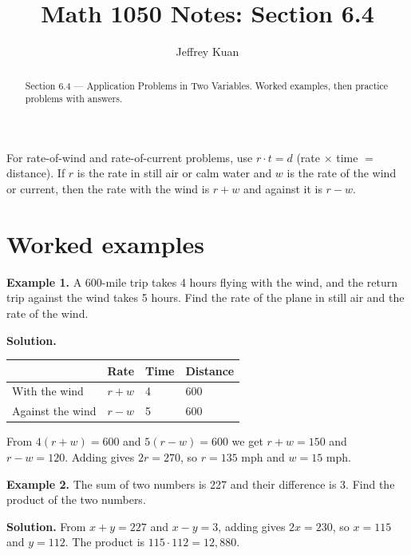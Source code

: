 \documentclass{ximera}
\author{Jeffrey Kuan}
\title{Math 1050 Notes: Section 6.4}
\begin{document}
\begin{abstract}
    Section 6.4 --- Application Problems in Two Variables.
    Worked examples, then practice problems with answers.
\end{abstract}

\maketitle

For rate-of-wind and rate-of-current problems, use $r\cdot t = d$ (rate $\times$ time $=$
distance). If $r$ is the rate in still air or calm water and $w$ is the rate of the wind
or current, then the rate with the wind is $r+w$ and against it is $r-w$.

\section*{Worked examples}

\begin{problem}

\textbf{Example 1.} A 600-mile trip takes 4 hours flying with the wind, and the return
trip against the wind takes 5 hours. Find the rate of the plane in still air and the rate
of the wind.

\begin{hint}
\textbf{Solution.}
\begin{center}
\begin{tabular}{|l|l|l|l|}
\hline
 & Rate & Time & Distance \\
\hline
With the wind & $r+w$ & 4 & 600 \\
\hline
Against the wind & $r-w$ & 5 & 600 \\
\hline
\end{tabular}
\end{center}
From $4(r+w)=600$ and $5(r-w)=600$ we get $r+w=150$ and $r-w=120$. Adding gives
$2r=270$, so $r=135$ mph and $w=15$ mph.
\end{hint}
\end{problem}

\begin{problem}

\textbf{Example 2.} The sum of two numbers is 227 and their difference is 3. Find the
product of the two numbers.

\begin{hint}
\textbf{Solution.} From $x+y=227$ and $x-y=3$, adding gives $2x=230$, so $x=115$ and
$y=112$. The product is $115 \cdot 112 = 12{,}880$.
\end{hint}
\end{problem}
\end{document}
